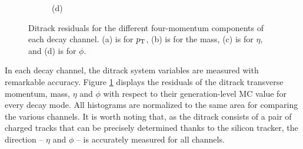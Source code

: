 \begin{myitemlist}
\begin{figure}[!ht]
\begin{subfigure}[t]{0.50\mylength}
                \caption{\footnotesize (d)}
        \end{subfigure}%
        \vspace*{-0.0cm}
        \caption{Ditrack residuals for the different four-momentum components of each decay channel. (a) is for $p_\text{T}$, (b) is for the mass, (c) is for $\eta$, and (d) is for $\phi$.}
        \label{fig:ditrack_residuals}
        \vspace*{-0.0cm}
    \end{figure}
    In each decay channel, the ditrack system variables are measured with remarkable accuracy. Figure \ref{fig:ditrack_residuals} displays the residuals of the ditrack transverse momentum, mass, $\eta$ and $\phi$ with respect to their generation-level MC value for every decay mode. All histograms are normalized to the same area for comparing the various channels. It is worth noting that, as the ditrack consists of a pair of charged tracks that can be precisely determined thanks to the silicon tracker, the direction -- $\eta$ and $\phi$ -- is accurately measured for all channels.


\end{myitemlist}
